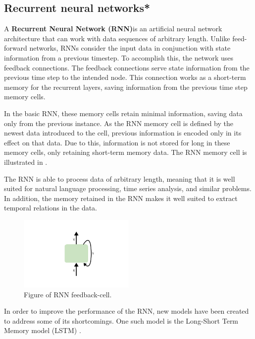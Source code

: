 \subsection{Recurrent neural networks*}
\label{section:BT:RNN}

A \textbf{Recurrent Neural Network (RNN)}is an artificial neural network architecture that can work with data sequences of arbitrary length.
Unlike feed-forward networks, RNNs consider the input data in conjunction with state information from a previous timestep.
To accomplish this, the network uses feedback connections.
The feedback connections serve state information from the previous time step to the intended node.
This connection works as a short-term memory for the recurrent layers, saving information from the previous time step memory cells.

In the basic RNN, these memory cells retain minimal information, saving data only from the previous instance.
As the RNN memory cell is defined by the newest data introduced to the cell, previous information is encoded only in its effect on that data.
Due to this, information is not stored for long in these memory cells, only retaining short-term memory data.
The RNN memory cell is illustrated in .

The RNN is able to process data of arbitrary length, meaning that it is well suited for natural language processing, time series analysis, and similar problems.
In addition, the memory retained in the RNN makes it well suited to extract temporal relations in the data.

\begin{figure}[h!]
  \centering
  \includegraphics[width=0.5\textwidth]{./sections/BT/figures/RNN.png}
  \hfill
  \caption{Figure of RNN feedback-cell.}
  \label{fig:rnn-cell}
\end{figure}



In order to improve the performance of the RNN, new models have been created to address some of its shortcomings.
One such model is the Long-Short Term Memory model (LSTM) \cite[p.~469-472]{Geron2017}.



